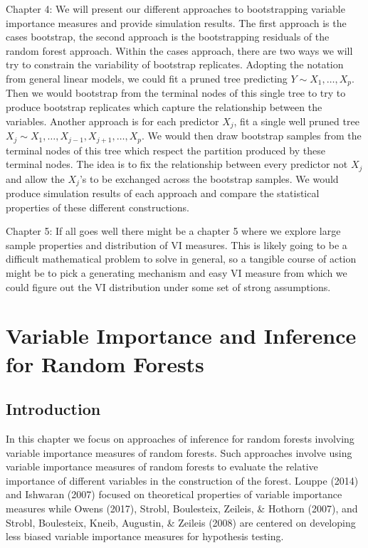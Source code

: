 \documentclass[12pt,twoside]{reedthesis}
\theoremstyle{definition}
\theoremstyle{definition}
\theoremstyle{definition}
\theoremstyle{remark}
\begin{document}
Chapter 4: We will present our different approaches to bootstrapping
variable importance measures and provide simulation results. The first
approach is the cases bootstrap, the second approach is the
bootstrapping residuals of the random forest approach. Within the cases
approach, there are two ways we will try to constrain the variability of
bootstrap replicates. Adopting the notation from general linear models,
we could fit a pruned tree predicting \(Y\sim X_1,\ldots,X_p\). Then we
would bootstrap from the terminal nodes of this single tree to try to
produce bootstrap replicates which capture the relationship between the
variables. Another approach is for each predictor \(X_j\), fit a single
well pruned tree \(X_j\sim X_1,\ldots,X_{j-1},X_{j+1},\ldots,X_p\). We
would then draw bootstrap samples from the terminal nodes of this tree
which respect the partition produced by these terminal nodes. The idea
is to fix the relationship between every predictor not \(X_j\) and allow
the \(X_j\)'s to be exchanged across the bootstrap samples. We would
produce simulation results of each approach and compare the statistical
properties of these different constructions.

Chapter 5: If all goes well there might be a chapter 5 where we explore
large sample properties and distribution of VI measures. This is likely
going to be a difficult mathematical problem to solve in general, so a
tangible course of action might be to pick a generating mechanism and
easy VI measure from which we could figure out the VI distribution under
some set of strong assumptions.

\chapter{Variable Importance and Inference for Random
Forests}\label{variable-importance-and-inference-for-random-forests}

\section{Introduction}\label{introduction-1}

In this chapter we focus on approaches of inference for random forests
involving variable importance measures of random forests. Such
approaches involve using variable importance measures of random forests
to evaluate the relative importance of different variables in the
construction of the forest. Louppe (2014) and Ishwaran (2007) focused on
theoretical properties of variable importance measures while Owens
(2017), Strobl, Boulesteix, Zeileis, \& Hothorn (2007), and Strobl,
Boulesteix, Kneib, Augustin, \& Zeileis (2008) are centered on
developing less biased variable importance measures for hypothesis
testing.
\end{document}
